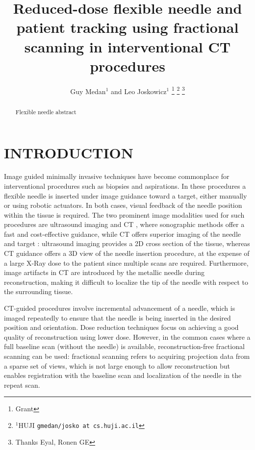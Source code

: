 \documentclass[letterpaper, 10 pt, conference]{ieeeconf}  %
\title{\LARGE \bf
Reduced-dose flexible needle and patient tracking using fractional scanning in interventional CT procedures 
}
\author{Guy Medan$^{1}$ and Leo Joskowicz$^{1}$%
\thanks{Grant}%
\thanks{$^{1}$HUJI
        {\tt\small gmedan/josko at cs.huji.ac.il}}%
\thanks{Thanks Eyal, Ronen GE}%
}
\begin{document}
\maketitle
\thispagestyle{empty}
\pagestyle{empty}


\begin{abstract}

Flexible needle abstract

\end{abstract}


\section{INTRODUCTION}

Image guided minimally invasive techniques have become commonplace for interventional procedures such as biopsies and aspirations.
In these procedures a flexible needle is inserted under image guidance toward a target, either manually or using robotic actuators.
In both cases, visual feedback of the needle position within the tissue is required. 
The two prominent image modalities used for such procedures are ultrasound imaging and CT , where sonographic methods offer a fast and cost-effective guidance, while CT offers superior imaging of the needle and target \cite{sheafor2000comparison}:
ultrasound imaging provides a 2D cross section of the tissue, whereas CT guidance offers a 3D view of the needle insertion procedure, at the expense of a large X-Ray dose to the patient since multiple scans are required. Furthermore, image artifacts in CT are introduced by the metallic needle during reconstruction, making it difficult to localize the tip of the needle with respect to the surrounding tissue.

CT-guided procedures involve incremental advancement of a needle, which is imaged repeatedly to ensure that the needle is being inserted in the desired position and orientation.
Dose reduction techniques focus on achieving a good quality of reconstruction using lower dose. However, in the common cases where a full baseline scan (without the needle) is available, reconstruction-free fractional scanning can be used: fractional scanning refers to acquiring projection data from a sparse set of views, which is not large enough to allow reconstruction but enables registration with the baseline scan and localization of the needle in the repeat scan.
\end{document}
